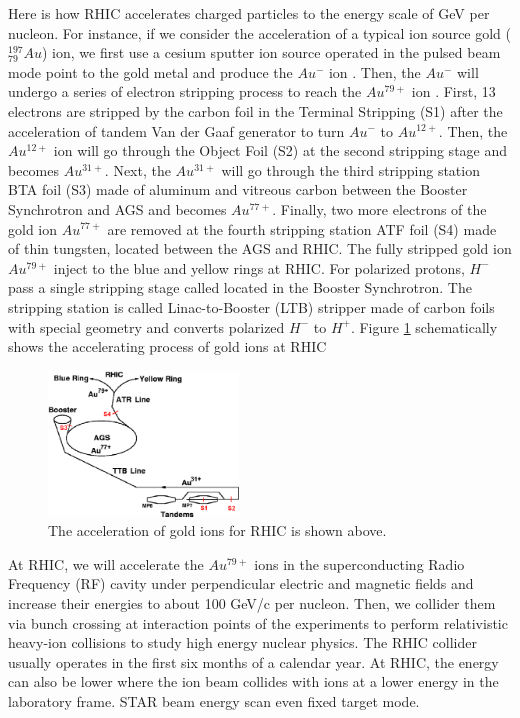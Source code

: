 Here is how RHIC accelerates charged particles to the energy scale of GeV per nucleon. For instance, if we consider the acceleration of a typical ion source gold (${}^{197}_{79}Au$) ion, we first use a cesium sputter ion source operated in the pulsed beam mode point to the gold metal and produce the $Au^-$ ion \cite{FirstAuSource}. Then, the $Au^{-}$ will undergo a series of electron stripping process to reach the $Au^{79+}$ ion \cite{RHICStrpDetail}. First, 13 electrons are stripped by the carbon foil in the Terminal Stripping (S1) after the acceleration of tandem Van der Gaaf generator to turn $Au^{-}$ to $Au^{12+}$. Then, the $Au^{12+}$ ion will go through the Object Foil (S2) at the second stripping stage and becomes $Au^{31+}$. Next, the $Au^{31+}$ will go through the third stripping station BTA foil (S3) made of aluminum and vitreous carbon between the Booster Synchrotron and AGS and becomes $Au^{77+}$. Finally, two more electrons of the gold ion $Au^{77+}$ are removed at the fourth stripping station ATF foil (S4) made of thin tungsten, located between the AGS and RHIC. The fully stripped gold ion $Au^{79+}$ inject to the blue and yellow rings at RHIC. For polarized protons, $H^-$ pass a single stripping stage called located in the Booster Synchrotron. The stripping station is called Linac-to-Booster (LTB) stripper made of carbon foils with special geometry and converts polarized $H^-$ to $H^+$. Figure \ref{AccAu} schematically shows the accelerating process of gold ions at RHIC \cite{AuStripRef}

\begin{figure}[hbtp]
\begin{center}
\includegraphics[width=0.45\textwidth]{Figures/Chapter1/AccAu.png}
\caption{The acceleration of gold ions for RHIC is shown above.}
\label{AccAu}
\end{center}
\end{figure} 

At RHIC, we will accelerate the $Au^{79+}$ ions in the superconducting Radio Frequency (RF) cavity under perpendicular electric and magnetic fields and increase their energies to about 100 GeV/c per nucleon. Then, we collider them via bunch crossing at interaction points of the experiments to perform relativistic heavy-ion collisions to study high energy nuclear physics. The RHIC collider usually operates in the first six months of a calendar year. At RHIC, the energy can also be lower where the ion beam collides with ions at a lower energy in the laboratory frame. STAR beam energy scan even fixed target mode.

